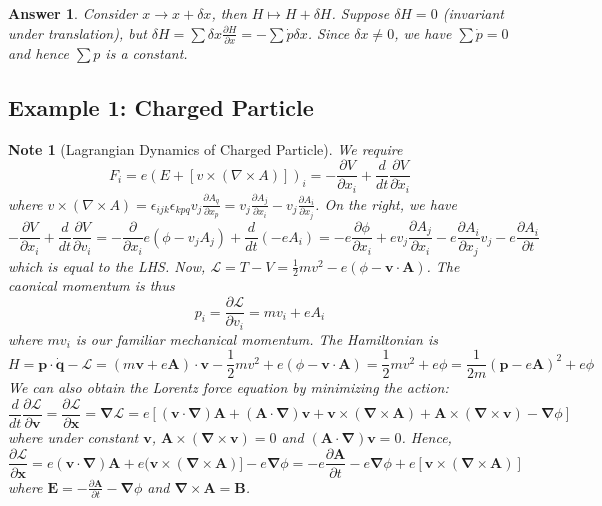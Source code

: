 \documentclass[a4paper]{article}
\newtheorem{ans}{Answer}[subsection]
\newtheorem{note}{Note}[section]
\theoremstyle{new}
\begin{document}
\begin{ans}
Consider $x\rightarrow x+\delta x$, then $H\mapsto H+\delta H$. Suppose $\delta H=0$ (invariant under translation), but $\delta H=\sum\delta x\frac{\partial H}{\partial x}=-\sum\dot{p}\delta x$. Since $\delta x\neq 0$, we have $\sum\dot{p}=0$ and hence $\sum p$ is a constant.
\end{ans}
\newpage
\subsection{Example 1: Charged Particle}
\begin{note}[Lagrangian Dynamics of Charged Particle]
We require
$$F_i=e(E+[v\times(\nabla\times A)])_i=-\frac{\partial V}{\partial x_i}+\frac{d}{dt}\frac{\partial V}{\partial\dot{x}_i}$$
where $v\times(\nabla\times A)=\epsilon_{ijk}\epsilon_{kpq}v_j\frac{\partial A_q}{\partial x_p}=v_j\frac{\partial A_j}{\partial x_i}-v_j\frac{\partial A_i}{\partial x_j}$. On the right, we have
$$-\frac{\partial V}{\partial x_i}+\frac{d}{dt}\frac{\partial V}{\partial v_i}=-\frac{\partial}{\partial x_i}e(\phi-v_jA_j)+\frac{d}{dt}(-eA_i)=-e\frac{\partial\phi}{\partial x_i}+ev_j\frac{\partial A_j}{\partial x_i}-e\frac{\partial A_i}{\partial x_j}v_j-e\frac{\partial A_i}{\partial t}$$
which is equal to the LHS. Now, $\mathcal{L}=T-V=\frac{1}{2}mv^2-e(\phi-\mathbf{v}\cdot\mathbf{A})$. The caonical momentum is thus
$$p_i=\frac{\partial\mathcal{L}}{\partial v_i}=mv_i+eA_i$$
where $mv_i$ is our familiar mechanical momentum. The Hamiltonian is
$$H=\mathbf{p}\cdot\mathbf{\dot{q}}-\mathcal{L}=(m\mathbf{v}+e\mathbf{A})\cdot\mathbf{v}-\frac{1}{2}mv^2+e(\phi-\mathbf{v}\cdot\mathbf{A})=\frac{1}{2}mv^2+e\phi=\frac{1}{2m}(\mathbf{p}-e\mathbf{A})^2+e\phi$$
We can also obtain the Lorentz force equation by minimizing the action:
$$\frac{d}{dt}\frac{\partial\mathcal{L}}{\partial\mathbf{v}}=\frac{\partial\mathcal{L}}{\partial\mathbf{x}}=\boldsymbol{\nabla}\mathcal{L}=e[(\mathbf{v}\cdot\boldsymbol{\nabla})\mathbf{A}+(\mathbf{A}\cdot\boldsymbol{\nabla})\mathbf{v}+\mathbf{v}\times(\boldsymbol{\nabla}\times\mathbf{A})+\mathbf{A}\times(\boldsymbol{\nabla}\times\mathbf{v})-\boldsymbol{\nabla}\phi]$$
where under constant $\mathbf{v}$, $\mathbf{A}\times(\boldsymbol{\nabla}\times\mathbf{v})=0$ and $(\mathbf{A}\cdot\boldsymbol{\nabla})\mathbf{v}=0$. Hence,
$$\frac{\partial\mathcal{L}}{\partial\mathbf{x}}=e(\mathbf{v}\cdot\boldsymbol{\nabla})\mathbf{A}+e(\mathbf{v}\times(\boldsymbol{\nabla}\times\mathbf{A})]-e\boldsymbol{\nabla}\phi=-e\frac{\partial\mathbf{A}}{\partial t}-e\boldsymbol{\nabla}\phi+e[\mathbf{v}\times(\boldsymbol{\nabla}\times\mathbf{A})]$$
where $\mathbf{E}=-\frac{\partial\mathbf{A}}{\partial t}-\boldsymbol{\nabla}\phi$ and $\boldsymbol{\nabla}\times\mathbf{A}=\mathbf{B}$.
\end{note}
\end{document}
